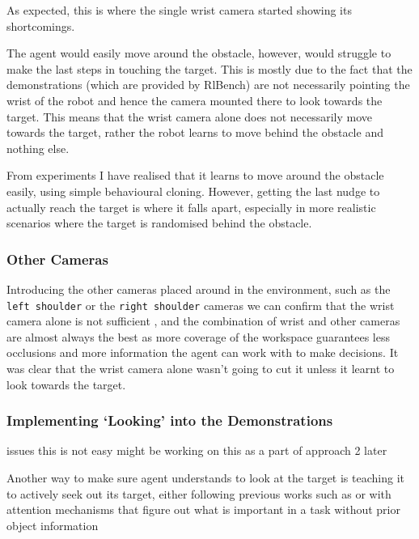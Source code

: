 As expected, this is where the single wrist camera started showing its shortcomings. 


The agent would easily move around the obstacle, however, would struggle to make the last steps in touching the target. This is mostly due to the fact that the demonstrations (which are provided by RlBench) are not necessarily pointing the wrist of the robot and hence the camera mounted there to look towards the target. This means that the wrist camera alone does not necessarily move towards the target, rather the robot learns to move behind the obstacle and nothing else.

From experiments I have realised that it learns to move around the obstacle easily, using simple behavioural cloning. However, getting the last nudge to actually reach the target is where it falls apart, especially in more realistic scenarios where the target is randomised behind the obstacle.

\subsubsection{Other Cameras}
Introducing the other cameras placed around in the environment, such as the \verb|left shoulder| or the \verb|right shoulder| cameras we can confirm that the wrist camera alone is not sufficient , and the combination of wrist and other cameras are almost always the best as more coverage of the workspace guarantees less occlusions and more information the agent can work with to make decisions. It was clear that the wrist camera alone wasn't going to cut it unless it learnt to look towards the target.

\subsubsection{Implementing `Looking' into the Demonstrations}\label{ew-looking-at-target}
issues this is not easy might be working on this as a part of approach 2 later

Another way to make sure agent understands to look at the target is teaching it to actively seek out its target, either following previous works such as  or with attention mechanisms that figure out what is important in a task without prior object information 

